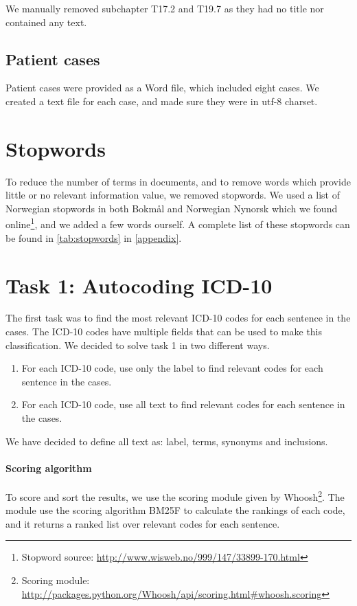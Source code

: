 We manually removed subchapter T17.2 and T19.7 as they had no title nor
contained any text.

\subsection{Patient cases}
Patient cases were provided as a Word file, which included eight cases. We
created a text file for each case, and made sure they were in utf-8 charset.


\section{Stopwords}
To reduce the number of terms in documents, and to remove words which provide
little or no relevant information value, we removed stopwords.
We used a list of Norwegian stopwords in both Bokmål and Norwegian Nynorsk
which we found
online\footnote{Stopword source: \url{http://www.wisweb.no/999/147/33899-170.html}},
and we added a few words ourself. A complete list of these stopwords can
be found in \autoref{tab:stopwords} in \autoref{appendix}.


\section{Task 1: Autocoding ICD-10}
The first task was to find the most relevant ICD-10 codes for each sentence in the cases. The ICD-10 codes have multiple fields that can be used to make this classification. We decided to solve task 1 in two different ways.
\begin{enumerate}
\item For each ICD-10 code, use only the label to find relevant codes for each sentence in the cases. 
\item For each ICD-10 code, use all text  to find relevant codes for each sentence in the cases.
\end{enumerate}
We have decided to define all text as: label, terms, synonyms and inclusions.

\paragraph{Scoring algorithm}
To score and sort the results, we use the scoring module given by Whoosh\footnote{Scoring module: \url{http://packages.python.org/Whoosh/api/scoring.html\#whoosh.scoring}}. The module use the scoring algorithm BM25F to calculate the rankings of each code, and it returns a ranked list over relevant codes for each sentence.

